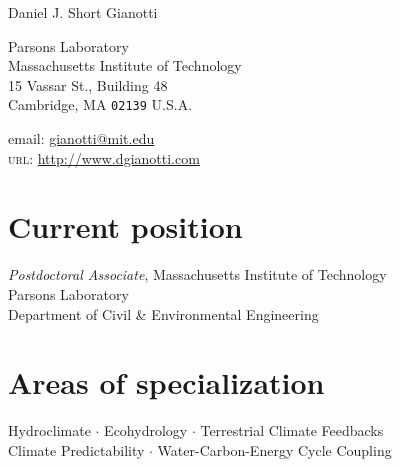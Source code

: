 \documentclass[10pt, a4paper]{article}
\renewcommand{\emph}[1]{\textit{#1}}
\newcommand{\years}[1]{\mbox{}\marginnote{\scriptsize #1}} %
\begin{document}
{\LARGE Daniel J. Short Gianotti}\\[0.7cm]
\begin{minipage}[t]{0.5\textwidth}
Parsons Laboratory\\
Massachusetts Institute of Technology\\
15 Vassar St., Building 48\\
Cambridge, MA \texttt{02139}
U.S.A.\\[.2cm]
\end{minipage}
\begin{minipage}[t]{0.5\textwidth}
\begin{flushright}
email: \href{mailto:gianotti@mit.edu}{gianotti@mit.edu}\\
\textsc{url}: \href{http://www.dgianotti.com}{http://www.dgianotti.com}\\ 
\end{flushright}
\end{minipage}

\section*{Current position}

\years{2016-Present}\emph{Postdoctoral Associate}, Massachusetts Institute of Technology\\
Parsons Laboratory\\
Department of Civil \& Environmental Engineering\\

\section*{Areas of specialization}
Hydroclimate $\cdot$ Ecohydrology $\cdot$ Terrestrial Climate Feedbacks\\
Climate Predictability $\cdot$ Water-Carbon-Energy Cycle Coupling\\

\end{document}
